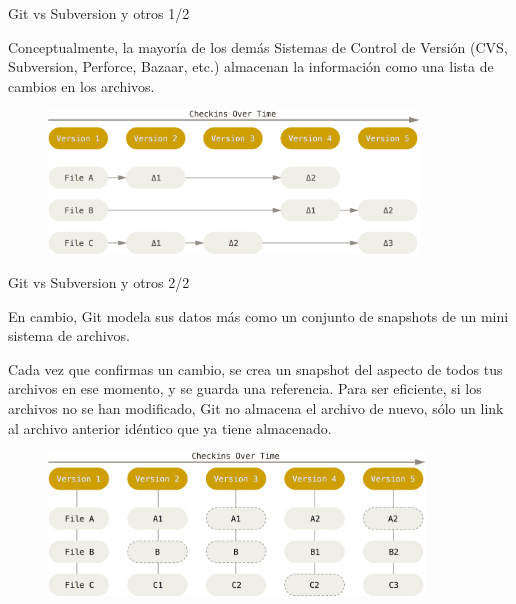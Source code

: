 \documentclass{beamer}
\begin{document}
\begin{frame}{Git vs Subversion y otros 1/2}

    Conceptualmente, la mayoría de los demás Sistemas de Control de Versión
    (CVS, Subversion, Perforce, Bazaar, etc.) almacenan la información
    como una lista de cambios en los archivos.

    \vspace{0.5em}

    \begin{figure}[ht]
        \begin{center}
            \includegraphics[height=1.5in]{svn-data.png}
        \end{center}
    \end{figure}

\end{frame}

\begin{frame}{Git vs Subversion y otros 2/2}

     En cambio, Git modela sus datos más como un conjunto de snapshots de un mini sistema de archivos.

     \vspace{0.5em}

     Cada vez que confirmas un cambio, se crea un snapshot del aspecto de todos tus archivos en ese momento, y se guarda una referencia.
     Para ser eficiente, si los archivos no se han modificado, Git no almacena el archivo de nuevo, sólo
     un link al archivo anterior idéntico que ya tiene almacenado.

    \vspace{0.5em}

    \begin{figure}[ht]
        \begin{center}
            \includegraphics[height=1.5in]{git-data.png}
        \end{center}
    \end{figure}

\end{frame}
\end{document}
